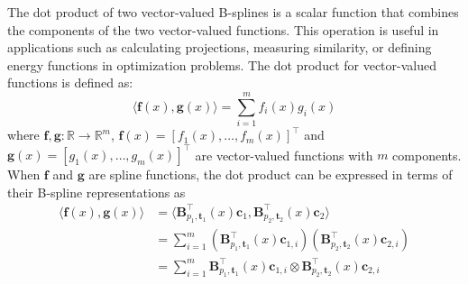 The dot product of two vector-valued B-splines is a scalar function that combines the components of the two vector-valued functions. This operation is useful in applications such as calculating projections, measuring similarity, or defining energy functions in optimization problems. The dot product for vector-valued functions is defined as:
\begin{equation}
    \label{eq:dot-product}
    \langle\mathbf f(x), \mathbf g(x)\rangle = \sum_{i=1}^m f_i(x) g_i(x)
\end{equation}
where $\mathbf f, \mathbf g: \mathbb{R} \to \mathbb{R}^m$, $\mathbf f(x) = [f_1(x), \ldots, f_m(x)]^\top$ and $\mathbf g(x) = [g_1(x), \ldots, g_m(x)]^\top$ are vector-valued functions with $m$ components. When $\mathbf f$ and $\mathbf g$ are spline functions, the dot product can be expressed in terms of their B-spline representations as
\begin{equation}
    \label{eq:dot-product-spline}
    \begin{aligned}
        \langle\mathbf f(x), \mathbf g(x)\rangle &= \langle\mathbf B_{p_1, \mathbf t_1}^\top(x) \mathbf c_1, \mathbf B_{p_2, \mathbf t_2}^\top(x) \mathbf c_2\rangle \\
        &= \sum_{i=1}^m \left(\mathbf B_{p_1, \mathbf t_1}^\top(x) \mathbf c_{1,i}\right) \left(\mathbf B_{p_2, \mathbf t_2}^\top(x) \mathbf c_{2,i}\right) \\
        &= \sum_{i=1}^m \mathbf B_{p_1, \mathbf t_1}^\top(x) \mathbf c_{1,i} \otimes \mathbf B_{p_2, \mathbf t_2}^\top(x) \mathbf c_{2,i} \\
    \end{aligned}
\end{equation}
